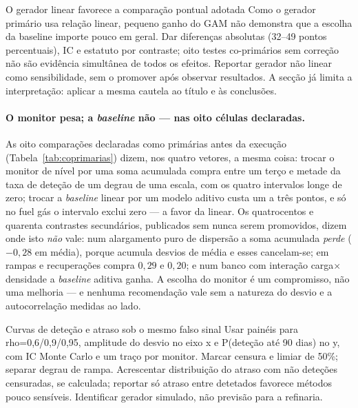 {O gerador linear favorece a comparação pontual adotada}
{Como o gerador primário usa relação linear, pequeno ganho do GAM não
demonstra que a escolha da baseline importe pouco em geral.
Dar diferenças absolutas (32--49 pontos percentuais), IC e estatuto
por contraste; oito testes co-primários sem correção não são evidência
simultânea de todos os efeitos. Reportar gerador não linear como
sensibilidade, sem o promover após observar resultados. A secção já
limita a interpretação: aplicar a mesma cautela ao título e às conclusões.}%
\paragraph{O monitor pesa; a \emph{baseline} não --- nas oito células
declaradas.} As oito comparações declaradas como primárias antes da
execução (Tabela~\ref{tab:coprimarias}) dizem, nos quatro vetores, a mesma
coisa: trocar o monitor de nível por uma soma acumulada compra entre um terço
e metade da taxa de deteção de um degrau de uma escala, com os quatro
intervalos longe de zero; trocar a \emph{baseline} linear por um modelo
aditivo custa um a três pontos, e só no fuel gás o intervalo exclui zero ---
a favor da linear. Os quatrocentos e quarenta contrastes secundários,
publicados sem nunca serem promovidos, dizem onde isto \emph{não} vale: num
alargamento puro de dispersão a soma acumulada \emph{perde} ($-0{,}28$ em
média), porque acumula desvios de média e esses cancelam-se; em rampas e
recuperações compra $0{,}29$ e $0{,}20$; e num banco com interação
carga$\times$densidade a \emph{baseline} aditiva ganha. A escolha do monitor
é um compromisso, não uma melhoria --- e nenhuma recomendação vale sem a
natureza do desvio e a autocorrelação medidas ao lado.

{Curvas de deteção e atraso sob o mesmo falso sinal}
{Usar painéis para rho=0,6/0,9/0,95, amplitude do desvio no eixo x e
P(deteção até 90 dias) no y, com IC Monte Carlo e um traço por monitor.
Marcar censura e limiar de 50\%; separar degrau de rampa.
Acrescentar distribuição do atraso com não deteções censuradas, se
calculada; reportar só atraso entre detetados favorece métodos pouco
sensíveis. Identificar gerador simulado, não previsão para a refinaria.}%
